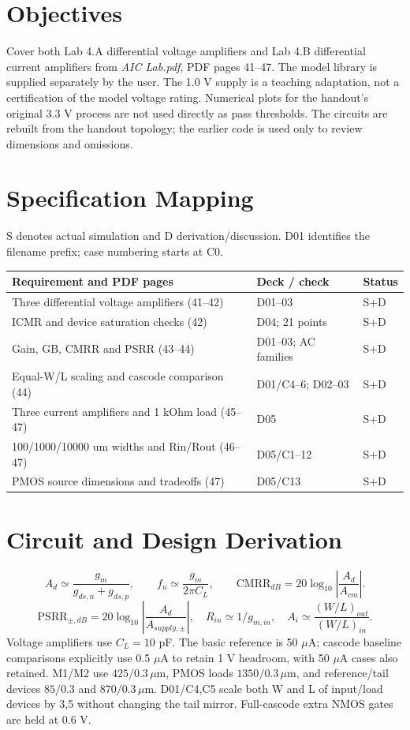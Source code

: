 \section{Objectives}
Cover both Lab 4.A differential voltage amplifiers and Lab 4.B differential current amplifiers from \textit{AIC Lab.pdf}, PDF pages 41--47. The model library is supplied separately by the user. The 1.0 V supply is a teaching adaptation, not a certification of the model voltage rating. Numerical plots for the handout's original 3.3 V process are not used directly as pass thresholds. The circuits are rebuilt from the handout topology; the earlier code is used only to review dimensions and omissions.

\section{Specification Mapping}
S denotes actual simulation and D derivation/discussion. D01 identifies the filename prefix; case numbering starts at C0.
\small\begin{longtable}{p{.46\linewidth}p{.30\linewidth}p{.15\linewidth}}\toprule
Requirement and PDF pages & Deck / check & Status \\ \midrule\endhead
Three differential voltage amplifiers (41--42) & D01--03 & S+D \\
ICMR and device saturation checks (42) & D04; 21 points & S+D \\
Gain, GB, CMRR and PSRR (43--44) & D01--03; AC families & S+D \\
Equal-W/L scaling and cascode comparison (44) & D01/C4--6; D02--03 & S+D \\
Three current amplifiers and 1 kOhm load (45--47) & D05 & S+D \\
100/1000/10000 um widths and Rin/Rout (46--47) & D05/C1--12 & S+D \\
PMOS source dimensions and tradeoffs (47) & D05/C13 & S+D \\
\bottomrule\end{longtable}\normalsize


\section{Circuit and Design Derivation}
\[
 A_d\simeq\frac{g_m}{g_{ds,n}+g_{ds,p}},\qquad
 f_u\simeq\frac{g_m}{2\pi C_L},\qquad
 \mathrm{CMRR}_{dB}=20\log_{10}\left|\frac{A_d}{A_{cm}}\right|.
 \]
 \[
 \mathrm{PSRR}_{\pm,dB}=20\log_{10}\left|\frac{A_d}{A_{supply,\pm}}\right|,
 \quad R_{in}\simeq1/g_{m,in},\quad A_i\simeq\frac{(W/L)_{out}}{(W/L)_{in}}.
 \]Voltage amplifiers use $C_L=10$ pF. The basic reference is 50 $\mu$A; cascode baseline comparisons explicitly use 0.5 $\mu$A to retain 1 V headroom, with 50 $\mu$A cases also retained. M1/M2 use $425/0.3\,\mu$m, PMOS loads $1350/0.3\,\mu$m, and reference/tail devices $85/0.3$ and $870/0.3\,\mu$m. D01/C4,C5 scale both W and L of input/load devices by 3,5 without changing the tail mirror. Full-cascode extra NMOS gates are held at 0.6 V.

